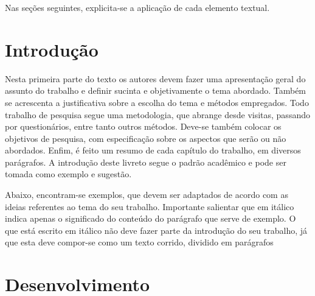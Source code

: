 \documentclass[
	12pt,				%
	openright,			%
	oneside,			%
	a4paper,			%
	english,			%
	french,				%
	spanish,			%
	brazil				%
	]{abntex2}
\begin{document}
\par Nas seções seguintes, explicita-se a aplicação de cada elemento textual.

\section{Introdução}
\par Nesta primeira parte do texto os autores devem fazer uma apresentação geral do assunto do trabalho e definir sucinta e objetivamente o tema abordado. Também se acrescenta a justificativa sobre a escolha do tema e métodos empregados. Todo trabalho de pesquisa segue uma metodologia, que abrange desde visitas, passando por questionários, entre tanto outros métodos. Deve-se também colocar os objetivos de pesquisa, com especificação sobre os aspectos que serão ou não abordados. Enfim, é feito um resumo de cada capítulo do trabalho, em diversos parágrafos. A introdução deste livreto segue o padrão acadêmico e pode ser tomada como exemplo e sugestão.
\par Abaixo, encontram-se exemplos, que devem ser adaptados de acordo com as ideias referentes ao tema do seu trabalho. Importante salientar que em itálico indica apenas o significado do conteúdo do parágrafo que serve de exemplo. O que está escrito em itálico não deve fazer parte da introdução do seu trabalho, já que esta deve compor-se como um texto corrido, dividido em parágrafos

\section{Desenvolvimento}
\end{document}
